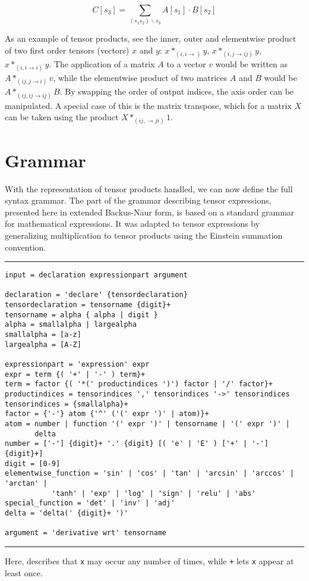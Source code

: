 \documentclass[12pt, a4paper]{report}
\begin{document}
\begin{equation}
    C[s_3] = \sum_{(s_1 s_2)  \backslash s_3} A[s_1] \cdot B[s_2]
    \label{eq:product}
\end{equation}

As an example of tensor products, see the inner, outer and elementwise product of two first order tensors (vectors) $x$ and $y$: $x*_{(i,i \rightarrow)}y$, $x*_{(i,j \rightarrow ij)}y$, $x*_{(i,i \rightarrow i)}y$.
The application of a matrix $A$ to a vector $v$ would be written as $A*_{(ij,j \rightarrow i)}v$, while the elementwise product of two matrices $A$ and $B$ would be $A*_{(ij,ij \rightarrow ij)}B$.
By swapping the order of output indices, the axis order can be manipulated.
A special case of this is the matrix transpose, which for a matrix $X$ can be taken using the product $X *_{(ij, \rightarrow ji)} 1$.

\section{Grammar}
With the representation of tensor products handled, we can now define the full syntax grammar.
The part of the grammar describing tensor expressions, presented here in extended Backus-Naur form, is based on a standard grammar for mathematical expressions.
It was adapted to tensor expressions by generalizing multiplication to tensor products using the Einstein summation convention.

\rule[-2pt]{\textwidth}{0.5pt}
{
\small
\begin{verbatim}
input = declaration expressionpart argument

declaration = 'declare' {tensordeclaration}
tensordeclaration = tensorname {digit}+
tensorname = alpha { alpha | digit }
alpha = smallalpha | largealpha
smallalpha = [a-z]
largealpha = [A-Z]

expressionpart = 'expression' expr
expr = term {( '+' | '-' ) term}+
term = factor {( '*(' productindices ')') factor | '/' factor}+
productindices = tensorindices ',' tensorindices '->' tensorindices
tensorindices = {smallalpha}+
factor = {'-'} atom {'^' ('(' expr ')' | atom)}+
atom = number | function '(' expr ')' | tensorname | '(' expr ')' | 
       delta
number = ['-'] {digit}+ '.' {digit} [( 'e' | 'E' ) ['+' | '-'] {digit}+]
digit = [0-9]
elementwise_function = 'sin' | 'cos' | 'tan' | 'arcsin' | 'arccos' | 'arctan' | 
           'tanh' | 'exp' | 'log' | 'sign' | 'relu' | 'abs'
special_function = 'det' | 'inv' | 'adj'
delta = 'delta(' {digit}+ ')' 

argument = 'derivative wrt' tensorname
\end{verbatim}
}
\rule[8pt]{\textwidth}{0.1pt}
Here, \texttt{} describes that \texttt{x} may occur any number of times, while \texttt{+} lets \texttt{x} appear at least once.
\end{document}
